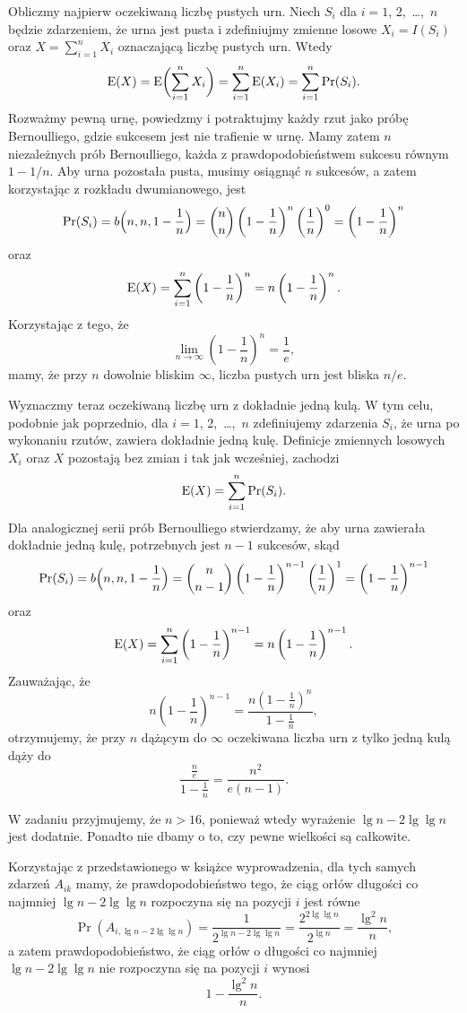 \exercise{} %
Obliczmy najpierw oczekiwaną liczbę pustych urn. Niech $S_i$ dla $i=1$, 2,~\dots,~$n$ będzie zdarzeniem, że  urna jest pusta i zdefiniujmy zmienne losowe $X_i=I(S_i)$ oraz $X=\sum_{i=1}^nX_i$ oznaczającą liczbę pustych urn. Wtedy
\[
	\operatorname{E}(X) = \operatorname{E}\biggl(\sum_{i=1}^nX_i\biggr) = \sum_{i=1}^n\operatorname{E}(X_i) = \sum_{i=1}^n\Pr(S_i).
\]
Rozważmy pewną urnę, powiedzmy  i potraktujmy każdy rzut jako próbę Bernoulliego, gdzie sukcesem jest nie trafienie w  urnę. Mamy zatem $n$ niezależnych prób Bernoulliego, każda z prawdopodobieństwem sukcesu równym $1-1/n$. Aby  urna pozostała pusta, musimy osiągnąć $n$ sukcesów, a zatem korzystając z rozkładu dwumianowego, jest
\[
	\Pr(S_i) = b\Bigl(n,n,1-\frac{1}{n}\Bigr) = \binom{n}{n}\left(1-\frac{1}{n}\right)^n\left(\frac{1}{n}\right)^0 = \left(1-\frac{1}{n}\right)^n
\]
oraz
\[
	\operatorname{E}(X) = \sum_{i=1}^n\left(1-\frac{1}{n}\right)^n = n\left(1-\frac{1}{n}\right)^n.
\]
Korzystając z tego, że
\[
	\lim_{n\to\infty}\left(1-\frac{1}{n}\right)^n = \frac{1}{e},
\]
mamy, że przy $n$ dowolnie bliskim $\infty$, liczba pustych urn jest bliska $n/e$.

Wyznaczmy teraz oczekiwaną liczbę urn z dokładnie jedną kulą. W tym celu, podobnie jak poprzednio, dla $i=1$, 2,~\dots,~$n$ zdefiniujemy zdarzenia $S_i$, że  urna po wykonaniu rzutów, zawiera dokładnie jedną kulę. Definicje zmiennych losowych $X_i$ oraz $X$ pozostają bez zmian i tak jak wcześniej, zachodzi
\[
	\operatorname{E}(X) = \sum_{i=1}^n\Pr(S_i).
\]
Dla analogicznej serii prób Bernoulliego stwierdzamy, że aby  urna zawierała dokładnie jedną kulę, potrzebnych jest $n-1$ sukcesów, skąd
\[
	\Pr(S_i) = b\Bigl(n,n,1-\frac{1}{n}\Bigr) = \binom{n}{n-1}\left(1-\frac{1}{n}\right)^{n-1}\left(\frac{1}{n}\right)^1 = \left(1-\frac{1}{n}\right)^{n-1}
\]
oraz
\[
	\operatorname{E}(X) = \sum_{i=1}^n\left(1-\frac{1}{n}\right)^{n-1} = n\left(1-\frac{1}{n}\right)^{n-1}.
\]
Zauważając, że
\[
	n\left(1-\frac{1}{n}\right)^{n-1} = \frac{n\left(1-\frac{1}{n}\right)^n}{1-\frac{1}{n}},
\]
otrzymujemy, że przy $n$ dążącym do $\infty$ oczekiwana liczba urn z tylko jedną kulą dąży do
\[
	\frac{\frac{n}{e}}{1-\frac{1}{n}} = \frac{n^2}{e(n-1)}.
\]

\exercise{} %
W zadaniu przyjmujemy, że $n>16$, ponieważ wtedy wyrażenie $\lg n-2\lg\lg n$ jest dodatnie. Ponadto nie dbamy o to, czy pewne wielkości są całkowite.

Korzystając z przedstawionego w książce wyprowadzenia, dla tych samych zdarzeń $A_{ik}$ mamy, że prawdopodobieństwo tego, że ciąg orłów długości co najmniej $\lg n-2\lg\lg n$ rozpoczyna się na pozycji $i$ jest równe
\[
	\Pr(A_{i,\lg n-2\lg\lg n}) = \frac{1}{2^{\lg n-2\lg\lg n}} = \frac{2^{2\lg\lg n}}{2^{\lg n}} = \frac{\lg^2n}{n},
\]
a zatem prawdopodobieństwo, że ciąg orłów o długości co najmniej $\lg n-2\lg\lg n$ nie rozpoczyna się na pozycji $i$ wynosi
\[
	1-\frac{\lg^2n}{n}.
\]

